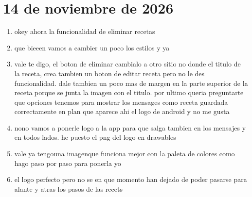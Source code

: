 \section{14 de noviembre de 2026}
\begin{enumerate}[resume]
  \item okey ahora la funcionalidad de eliminar recetas
  \item que bieeen vamos a cambier un poco los estilos y ya
  \item vale te digo, el boton de eliminar cambialo a otro sitio no donde el titulo de la receta, crea tambien un boton de editar receta pero no le des funcionalidad.
  dale tambien un poco mas de margen en la parte superior de la receta porque se junta la imagen con el titulo.
  por ultimo queria preguntarte que opciones tenemos para mostrar los mensages como receta guardada correctamente en plan que aparece ahi el logo de android y no me gusta
  \item nono vamos a ponerle logo a la app para que salga tambien en los mensajes y en todos lados. he puesto el png del logo en drawables
  \item vale ya tengouna imagenque funciona mejor con la paleta de colores como hago paso por paso para ponerla yo
  \item el logo perfecto pero no se en que momento han dejado de poder pasarse para alante y atras los pasos de las recets
\end{enumerate}

